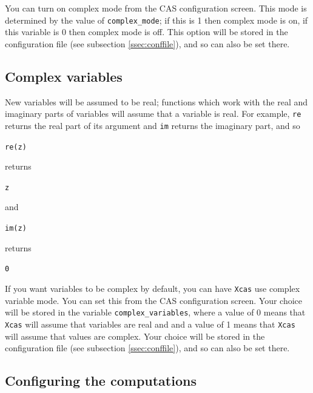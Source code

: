 \documentclass[a4paper,11pt]{book}
\begin{document}
You can turn on complex mode from the CAS configuration screen.  This
mode is determined by the value of \texttt{complex\_mode}; if this is
1 then complex mode is on, if this variable is 0 then complex mode is
off. This option will be stored in the configuration file (see subsection \ref{ssec:conffile}), and
so can also be set there.

\subsection{Complex variables}
\label{ssec:cvars}

New variables will be assumed to be real; functions which work with
the real and imaginary parts of variables will assume that a variable
is real.  For example, \texttt{re} returns the real part of its
argument and \texttt{im} returns the imaginary part, and so
\begin{center}
  \texttt{re(z)}
\end{center}
returns
\begin{center}
  \texttt{z}
\end{center}
and
\begin{center}
  \texttt{im(z)}
\end{center}
returns
\begin{center}
  \texttt{0}
\end{center}

If you want variables to be complex by default, you can have
\texttt{Xcas} use complex variable mode.  
You can set this from the CAS configuration screen.  Your choice will
be stored in the variable \texttt{complex\_variables}, where a value of 0
means that \texttt{Xcas} will assume that variables are real and 
and a value of 1 means that \texttt{Xcas} will assume that values are
complex.  Your choice will be stored in the configuration file
(see subsection \ref{ssec:conffile}), and so can also be set there.

\subsection{Configuring the computations}
\label{ssec:confcomp}
\end{document}
